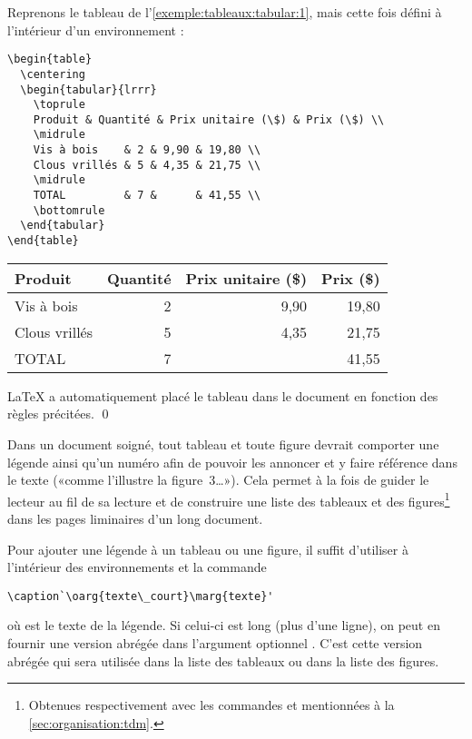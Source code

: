 \begin{exemple}
  Reprenons le tableau de l'\autoref{exemple:tableaux:tabular:1}, mais cette
  fois défini à l'intérieur d'un environnement :
\begin{lstlisting}
\begin{table}
  \centering
  \begin{tabular}{lrrr}
    \toprule
    Produit & Quantité & Prix unitaire (\$) & Prix (\$) \\
    \midrule
    Vis à bois    & 2 & 9,90 & 19,80 \\
    Clous vrillés & 5 & 4,35 & 21,75 \\
    \midrule
    TOTAL         & 7 &      & 41,55 \\
    \bottomrule
  \end{tabular}
\end{table}
\end{lstlisting}
  \begin{table}
    \centering
    \begin{tabular}{lrrr}
      \toprule
      Produit & Quantité & Prix unitaire (\$) & Prix (\$) \\
      \midrule
      Vis à bois    & 2 & 9,90 & 19,80 \\
      Clous vrillés & 5 & 4,35 & 21,75 \\
      \midrule
      TOTAL         & 7 &      & 41,55 \\
      \bottomrule
    \end{tabular}
  \end{table}
  {\LaTeX} a automatiquement placé le tableau dans le document en
  fonction des règles précitées. %
  \qed
\end{exemple}

Dans un document soigné, tout tableau et toute figure devrait
comporter une légende ainsi qu'un numéro afin de pouvoir les
annoncer et y faire référence dans le texte («comme l'illustre la
figure~3\dots»). Cela
permet à la fois de guider le lecteur au fil de sa lecture et de
construire une liste des tableaux et des figures\footnote{%
  Obtenues respectivement avec les commandes \cmd{\listoftables} et
  \cmd{\listoffigures} mentionnées à la
  \autoref{sec:organisation:tdm}.} %
dans les pages liminaires d'un long document.

Pour ajouter une légende à un tableau ou une figure, il suffit
d'utiliser à l'intérieur des environnements  et 
la commande
\begin{lstlisting}
\caption`\oarg{texte\_court}\marg{texte}'
\end{lstlisting}
où  est le texte de la légende. Si celui-ci est long
(plus d'une ligne), on peut en fournir une version abrégée dans
l'argument optionnel . C'est cette version abrégée
qui sera utilisée dans la liste des tableaux ou dans la liste des
figures.

